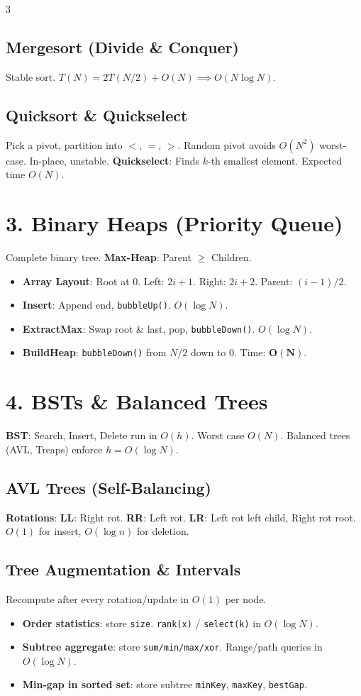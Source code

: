 \documentclass[7pt,landscape]{extarticle}
\begin{document}
\begin{multicols*}{3}
\subsection*{Mergesort (Divide \& Conquer)}
Stable sort. $T(N) = 2T(N/2) + O(N) \implies O(N \log N)$.


\subsection*{Quicksort \& Quickselect}
Pick a pivot, partition into $<$, $=$, $>$. Random pivot avoids $O(N^2)$ worst-case. In-place, unstable.
\textbf{Quickselect}: Finds $k$-th smallest element. Expected time $O(N)$.

\section*{3. Binary Heaps (Priority Queue)}
Complete binary tree. \textbf{Max-Heap}: Parent $\ge$ Children. 
\begin{itemize}
    \item \textbf{Array Layout}: Root at $0$. Left: $2i + 1$. Right: $2i + 2$. Parent: $(i - 1) / 2$.
    \item \textbf{Insert}: Append end, \texttt{bubbleUp()}. $O(\log N)$.
    \item \textbf{ExtractMax}: Swap root \& last, pop, \texttt{bubbleDown()}. $O(\log N)$.
    \item \textbf{BuildHeap}: \texttt{bubbleDown()} from $N/2$ down to $0$. Time: $\mathbf{O(N)}$.
\end{itemize}

\section*{4. BSTs \& Balanced Trees}
\textbf{BST}: Search, Insert, Delete run in $O(h)$. Worst case $O(N)$. Balanced trees (AVL, Treaps) enforce $h = O(\log N)$.

\subsection*{AVL Trees (Self-Balancing)}
\textbf{Rotations}: \textbf{LL}: Right rot. \textbf{RR}: Left rot. \textbf{LR}: Left rot left child, Right rot root. $O(1)$ for insert, $O(\log n)$ for deletion.

\subsection*{Tree Augmentation \& Intervals}
Recompute after every rotation/update in $O(1)$ per node.
\begin{itemize}
  \item \textbf{Order statistics}: store \texttt{size}. \texttt{rank(x)} / \texttt{select(k)} in $O(\log N)$.
  \item \textbf{Subtree aggregate}: store \texttt{sum/min/max/xor}. Range/path queries in $O(\log N)$.
  \item \textbf{Min-gap in sorted set}: store subtree \texttt{minKey}, \texttt{maxKey}, \texttt{bestGap}.
\end{itemize}



\end{multicols*}
\end{document}
